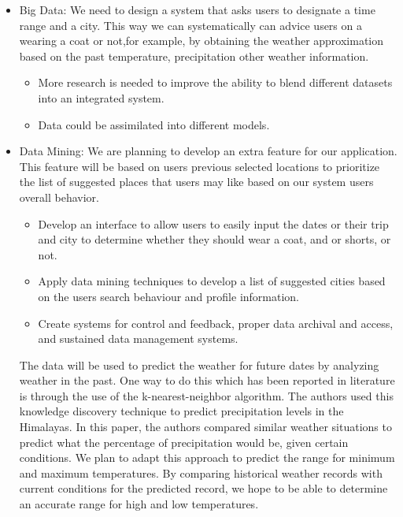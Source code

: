 \documentclass{sig-alternate}
\begin{document}
\begin{itemize}

	\item Big Data:\newline
	We need to design a system that asks users to designate a time range and a city. This 		way we can systematically can advice users on a wearing a coat or not,for example, by 		obtaining the weather approximation based on the past temperature, precipitation other
 	weather information.
 \newline
	
	\begin{itemize}
		\item 
		More research is needed to improve the ability to blend different datasets into an 		integrated system.
		
		\item 
		Data could be assimilated into different models.
	\end{itemize}
	
	\item Data Mining:\newline
	We are planning to develop an extra feature for our application. This feature will be 		based on users previous selected locations to prioritize the list of suggested places 		that users may like based on our system users overall behavior.

	\begin{itemize}
		\item 
		Develop an interface to allow users to easily input the dates or their trip and 	  		city to determine whether they should wear a coat, and or shorts, or not.
		
		\item 
		Apply data mining techniques to develop a list of suggested cities based on the 				users search behaviour and profile information.
		
		\item 
		Create systems for control and feedback, proper data archival and access, and 				sustained data management systems.
	\end{itemize}
	
		The data will be used to predict the weather for future dates by analyzing weather in the past. One way to do this which has been reported in literature is through the use of the k-nearest-neighbor algorithm. The authors used this knowledge discovery technique to predict precipitation levels in the Himalayas. In this paper, the authors compared similar weather situations to predict what the percentage of precipitation would be, given certain conditions. We plan to adapt this approach to predict the range for minimum and maximum temperatures. By comparing historical weather records with current conditions for the predicted record, we hope to be able to determine an accurate range for high and low temperatures. \newline
	
\end{itemize}
\end{document}
